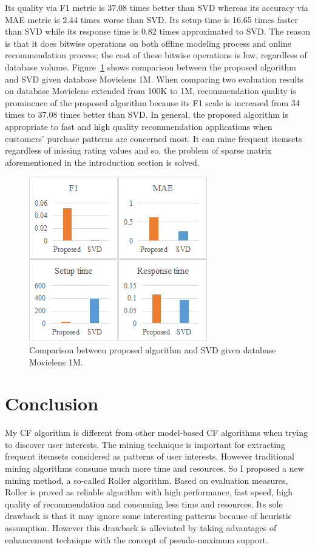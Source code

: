 \documentclass[10pt]{article}
\begin{document}
Its quality via F1 metric is 37.08 times better than SVD whereas its accuracy via MAE metric is 2.44 times worse than SVD. Its setup time is 16.65 times faster than SVD while its response time is 0.82 times approximated to SVD. The reason is that it does bitwise operations on both offline modeling process and online recommendation process; the cost of these bitwise operations is low, regardless of database volume. Figure~\ref{figure:comparison1m} shows comparison between the proposed algorithm and SVD given database Movielens 1M. When comparing two evaluation results on database Movielens extended from 100K to 1M, recommendation quality is prominence of the proposed algorithm because its F1 scale is increased from 34 times to 37.08 times better than SVD. In general, the proposed algorithm is appropriate to fast and high quality recommendation applications when customers' purchase patterns are concerned most. It can mine frequent itemsets regardless of missing rating values and so, the problem of sparse matrix aforementioned in the introduction section is solved.
\begin{figure}
\centering
\includegraphics{Comparison1M.png}
\caption{Comparison between proposed algorithm and SVD given database Movielens 1M.}
\label{figure:comparison1m}
\end{figure}

\section{Conclusion} \label{section:conclusion}
My CF algorithm is different from other model-based CF algorithms when trying to discover user interests. The mining technique is important for extracting frequent itemsets considered as patterns of user interests. However traditional mining algorithms consume much more time and resources. So I proposed a new mining method, a so-called Roller algorithm. Based on evaluation measures, Roller is proved as reliable algorithm with high performance, fast speed, high quality of recommendation and consuming less time and resources. Its sole drawback is that it may ignore some interesting patterns because of heuristic assumption. However this drawback is alleviated by taking advantages of enhancement technique with the concept of pseudo-maximum support.
\end{document}
